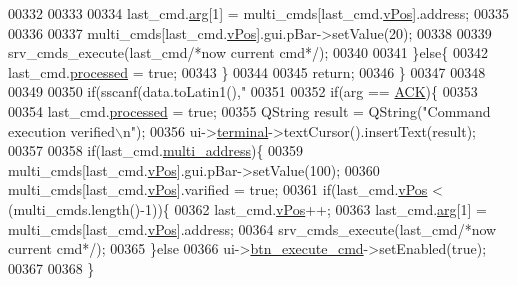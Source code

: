 \begin{DoxyCode}
00332 
00333 
00334                  last\_cmd.\hyperlink{a00001_a56e6c2d7315d0ae60a51e8b140c9cfe4}{arg}[1] = multi\_cmds[last\_cmd.\hyperlink{a00001_a2b48b371fd84be2a8ad581b1ad708b88}{vPos}].address;
00335 
00336 
00337                  multi\_cmds[last\_cmd.\hyperlink{a00001_a2b48b371fd84be2a8ad581b1ad708b88}{vPos}].gui.pBar->setValue(20);
00338 
00339                  srv\_cmds\_execute(last\_cmd\textcolor{comment}{/*now current cmd*/});
00340 
00341              \}\textcolor{keywordflow}{else}\{
00342                  last\_cmd.\hyperlink{a00001_a3e88f779da9798a5da7dda227e2ca388}{processed} = \textcolor{keyword}{true};
00343              \}
00344 
00345              \textcolor{keywordflow}{return};
00346      \}
00347 
00348 
00349 
00350     \textcolor{keywordflow}{if}(sscanf(data.toLatin1(),\textcolor{stringliteral}{"%
00351 
00352        \textcolor{keywordflow}{if}(arg == \hyperlink{a00034_a6f6489887e08bff4887d0bc5dcf214d8}{ACK})\{
00353 
00354                     last\_cmd.\hyperlink{a00001_a3e88f779da9798a5da7dda227e2ca388}{processed} = \textcolor{keyword}{true};
00355                     QString result =  QString(\textcolor{stringliteral}{"Command execution verified\(\backslash\)n"});
00356                     ui->\hyperlink{a00027_aae71c46ea4546df5994735dee573b2dd}{terminal}->textCursor().insertText(result);
00357 
00358                     \textcolor{keywordflow}{if}(last\_cmd.\hyperlink{a00001_a8e69b971c61ced27a7567efd2bf0db59}{multi\_address})\{
00359                          multi\_cmds[last\_cmd.\hyperlink{a00001_a2b48b371fd84be2a8ad581b1ad708b88}{vPos}].gui.pBar->setValue(100);
00360                          multi\_cmds[last\_cmd.\hyperlink{a00001_a2b48b371fd84be2a8ad581b1ad708b88}{vPos}].varified = \textcolor{keyword}{true};
00361                      \textcolor{keywordflow}{if}(last\_cmd.\hyperlink{a00001_a2b48b371fd84be2a8ad581b1ad708b88}{vPos} < (multi\_cmds.length()-1))\{
00362                         last\_cmd.\hyperlink{a00001_a2b48b371fd84be2a8ad581b1ad708b88}{vPos}++;
00363                         last\_cmd.\hyperlink{a00001_a56e6c2d7315d0ae60a51e8b140c9cfe4}{arg}[1] = multi\_cmds[last\_cmd.\hyperlink{a00001_a2b48b371fd84be2a8ad581b1ad708b88}{vPos}].address;
00364                         srv\_cmds\_execute(last\_cmd\textcolor{comment}{/*now current cmd*/});
00365                     \}\textcolor{keywordflow}{else}
00366                         ui->\hyperlink{a00027_a9ea50d44e38316e4203933698cbc14a6}{btn\_execute\_cmd}->setEnabled(\textcolor{keyword}{true});
00367 
00368                     \}
}
\end{DoxyCode}
